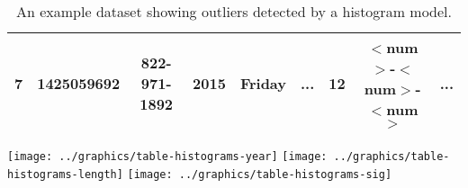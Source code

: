 \begin{table*}[t]
\begin{center}
\begin{tabular}{|c|c|c||c|c|c||c|c|c|}
7 & 1425059692 & 822-971-1892 & 2015 & Friday &...& 12 & $<$num$>$-$<$num$>$-$<$num$>$ &  ...\\ \hline 
\end{tabular}
\caption{An example dataset showing outliers detected by a histogram model.}
\label{tab:example}
\end{center}
\hspace{6.5cm} 
\texttt{[image: ../graphics/table-histograms-year]}
\hspace{2.8cm} 
\texttt{[image: ../graphics/table-histograms-length]}
\hspace{1.5cm} 
\texttt{[image: ../graphics/table-histograms-sig]}

\end{table*}
